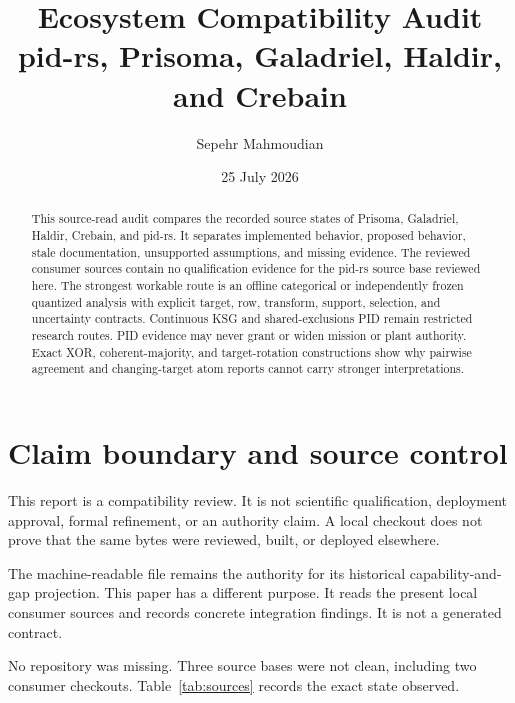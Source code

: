 \documentclass[11pt]{article}
\title{\PidReportTitle%
  {Ecosystem Compatibility Audit}
  {pid-rs, Prisoma, Galadriel, Haldir, and Crebain}}
\author{Sepehr Mahmoudian}
\date{25 July 2026}
\begin{document}
\PidMakeTitle%

\begin{abstract}
This source-read audit compares the recorded source states of Prisoma,
Galadriel, Haldir, Crebain, and pid-rs.  It separates implemented behavior,
proposed behavior, stale documentation, unsupported assumptions, and missing
evidence.  The reviewed consumer sources contain no qualification evidence for
the pid-rs source base reviewed here.  The strongest workable route is an offline categorical or
independently frozen quantized analysis with explicit target, row, transform,
support, selection, and uncertainty contracts.  Continuous KSG and
shared-exclusions PID remain restricted research routes.  PID evidence may never
grant or widen mission or plant authority.  Exact XOR, coherent-majority, and
target-rotation constructions show why pairwise agreement and changing-target
atom reports cannot carry stronger interpretations.
\end{abstract}

\setcounter{tocdepth}{1}
\begingroup
\setlength{\parskip}{0pt}
\footnotesize
\tableofcontents
\endgroup
\newpage

\section{Claim boundary and source control}

This report is a compatibility review.  It is not scientific qualification,
deployment approval, formal refinement, or an authority claim.  A local checkout
does not prove that the same bytes were reviewed, built, or deployed elsewhere.

The machine-readable file  remains the
authority for its historical capability-and-gap projection.  This paper has a
different purpose.  It reads the present local consumer sources and records
concrete integration findings.  It is not a generated contract.

No repository was missing.  Three source bases were not clean, including two
consumer checkouts.  Table~\ref{tab:sources} records the exact state observed.
\end{document}
